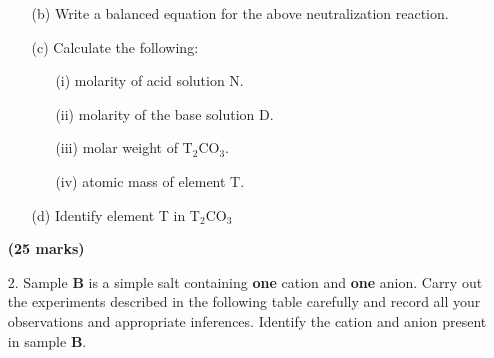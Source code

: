 \begin{enumerate}
\begin{enumerate}
\item[(b)] Write a balanced equation for the above neutralization reaction.\\
\item[(c)] Calculate the following:\\
\begin{enumerate}
\item[(i)] molarity of acid solution N.
\item[(ii)] molarity of the base solution D.
\item[(iii)] molar weight of T$_2$CO$_3$.
\item[(iv)] atomic mass of element T.
\end{enumerate}
\item[(d)] Identify element T in T$_2$CO$_3$
\end{enumerate}

\raggedleft \textbf{(25 marks)}\newpage

\raggedright

\item[2.] Sample \textbf{B} is a simple salt containing \textbf{one} cation and \textbf{one} anion. Carry out the experiments described in the following table carefully and record all your observations and appropriate inferences. Identify the cation and anion present in sample \textbf{B}.\\


\end{enumerate}
